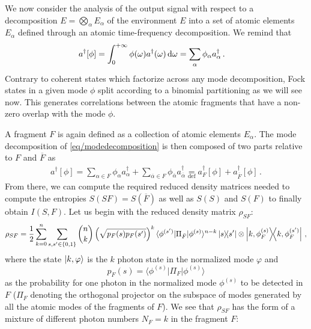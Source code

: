 We now consider the analysis of the output signal with respect
to a decomposition $E = \bigotimes_\alpha E_\alpha$ of the environment
$E$ into a set of atomic elements $E_\alpha$ defined through an atomic
time-frequency decomposition.  We remind that
%
\begin{align}
a^\dagger[\phi] &= \int_0^{+\infty} \phi(\omega) a^\dagger(\omega) \,\mathrm{d}\omega
	=\sum_\alpha \phi_\alpha a^\dagger_\alpha
\,.
\label{eq/modedecomposition}
\end{align}
Contrary to coherent states which factorize across any mode
decomposition, Fock states in a given mode $\phi$ split according to a
binomial partitioning as we will see now. This generates
correlations between the atomic fragments that have a non-zero overlap
with the mode $\phi$.

A fragment $F$ is again defined as a collection of atomic elements
$E_\alpha$. 
The mode decomposition of \cref{eq/modedecomposition} is then
composed of two parts relative to $F$ and $\overline{F}$ as
%
\begin{align}
a^\dagger[\phi] = \sum_{\alpha\in F} \phi_\alpha a^\dagger_\alpha
+ \sum_{\overline{\alpha}\in F} \phi_{\overline{\alpha}}a^\dagger_{\overline{\alpha}}
\underset{\text{def}}{=}
a^\dagger_F[\phi] + a^\dagger_{\overline{F}}[\phi]
\,.
\end{align}
From there, we can compute the required reduced density
matrices needed to compute the entropies 
$S(SF)=S(\overline{F})$ as well as $S(S)$ and $S(F)$ to finally obtain
$I(S,F)$.
Let us begin with
the reduced density matrix $\rho_{SF}$:
%
\begin{equation}
\rho_{SF} = \frac{1}{2}\sum_{k=0}^n \sum_{s,s' \in\lbrace 0,1 \rbrace} \binom{n}{k}
	\left(\sqrt{p_F(s)p_F(s')}\right)^k 
	\langle \phi^{(s')} | \Pi_{\bar{F}} | \phi^{(s)} \rangle^{n-k}
	\ketbra{s}{s'}
\otimes	\ketbra{k,\phi^{(s)}_F}{k,\phi^{(s')}_F}
\,,
\label{eq/reducedmatrixFock}
\end{equation}
where the state
$\ket{k,\varphi}$
is the $k$ photon state in the normalized mode
$\varphi$ and 
\begin{equation}
	p_F(s)=\langle \phi^{(s)}|\Pi_F|\phi^{(s)}\rangle
\end{equation}
as the probability for one photon in the normalized mode $\phi^{(s)}$ to
be detected in $F$ ($\Pi_F$ denoting the orthogonal projector on the
subspace of modes generated by all the atomic modes of the fragments of
$F$). We see that  $\rho_{SF}$ has the form of a
mixture of different photon numbers $N_F=k$ in the fragment $F$:
